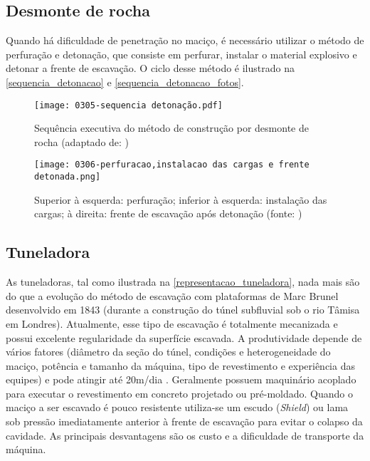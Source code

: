 \subsection{Desmonte de rocha}

Quando há dificuldade de penetração no maciço, é necessário utilizar o método de perfuração e detonação, que consiste em perfurar, instalar o material explosivo e detonar a frente de escavação. O ciclo desse método é ilustrado na \autoref{sequencia_detonacao} e \autoref{sequencia_detonacao_fotos}.

\begin{figure}[H]
	\begin{center}
		\texttt{[image: 0305-sequencia detonação.pdf]}
	\end{center}
	\caption{\label{sequencia_detonacao}Sequência executiva do método de construção por desmonte de rocha (adaptado de: )}
\end{figure}

\begin{figure}[H]
	\begin{center}
		\texttt{[image: 0306-perfuracao,instalacao das cargas e frente detonada.png]}
	\end{center}
	\caption{\label{sequencia_detonacao_fotos}Superior à esquerda: perfuração; inferior à esquerda: instalação das cargas; à direita: frente de escavação após detonação (fonte: )}
\end{figure}

\subsection{Tuneladora}

As tuneladoras, tal como ilustrada na \autoref{representacao_tuneladora}, nada mais são do que a evolução do método de escavação com plataformas de Marc Brunel desenvolvido em 1843 (durante a construção do túnel subfluvial sob o rio Tâmisa em Londres). Atualmente, esse tipo de escavação é totalmente mecanizada e possui excelente regularidade da superfície escavada. A produtividade depende de vários fatores (diâmetro da seção do túnel, condições e heterogeneidade do maciço, potência e tamanho da máquina, tipo de revestimento e experiência das equipes) e pode atingir até 20m/dia \cite[p. 98]{Brox2017}. Geralmente possuem maquinário acoplado para executar o revestimento em concreto projetado ou pré-moldado. Quando o maciço a ser escavado é pouco resistente utiliza-se um escudo (\textit{Shield}) ou lama sob pressão imediatamente anterior à frente de escavação para evitar o colapso da cavidade. As principais desvantagens são os custo e a dificuldade de transporte da máquina.

